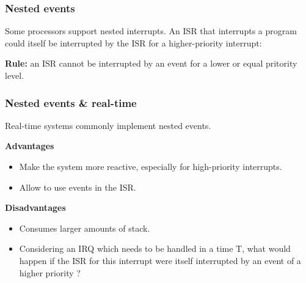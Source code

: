 %
%
%

\begin{frame}
  \frametitle{Nested events}

  Some processors support nested interrupts. An ISR that interrupts a program
  could itself be interrupted by the ISR for a higher-priority interrupt:
  \begin{center}
  \end{center}

  \nl

  {\bf Rule:} an ISR cannot be interrupted by an event for a lower or equal
  pritority level.

\end{frame}

%
%
%

\begin{frame}
  \frametitle{Nested events \& real-time}

  Real-time systems commonly implement nested events.

  \nl

  {\bf Advantages}

  \begin{itemize}
    \item Make the system more reactive, especially for high-priority
      interrupts.
    \item Allow to use events in the ISR.
  \end{itemize}

  \nl

  {\bf Disadvantages}

  \begin{itemize}
    \item Consumes larger amounts of stack.
    \item Considering an IRQ which needs to be handled in a time T, what
      would happen if the ISR for this interrupt were itself interrupted by an
      event of a higher priority ?
  \end{itemize}

\end{frame}
